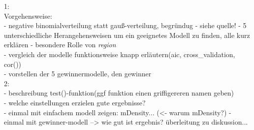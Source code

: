 1: \\
Vorgehensweise: \\
 - negative binomialverteilung statt gauß-verteilung, begründug - siehe quelle!
 - 5 unterschiedliche Herangehensweisen um ein geeignetes Modell zu finden, alle kurz erklären
 - besondere Rolle von \textit{region} \\
 - vergleich der modelle funktionsweise knapp erläutern(aic, cross_validation, cor()) \\
 - vorstellen der 5 gewinnermodelle, den gewinner \\
2: \\
 - beschreibung test()-funktion(ggf funktion einen griffigereren namen geben) \\
 - welche einstellungen erzielen gute ergebnisse? \\
 - einmal mit einfachem modell zeigen: mDensity... (<- warum mDensity?)
 - einmal mit gewinner-modell --> wie gut ist ergebnis? überleitung zu diskussion...
 